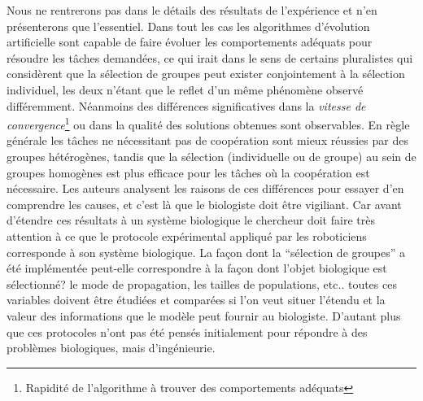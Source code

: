 \documentclass[a4paper,10pt]{article}
\begin{document}
Nous ne rentrerons pas dans le détails des résultats de l'expérience et n'en présenterons que l'essentiel. Dans tout les cas les algorithmes d'évolution artificielle sont capable de faire évoluer les comportements adéquats pour résoudre les t\^aches demandées, ce qui irait dans le sens de certains pluralistes qui considèrent que la sélection de groupes peut exister conjointement à la sélection individuel, les deux n'étant que le reflet d'un même phénomène observé différemment. 
Néanmoins des différences significatives dans la \emph{vitesse de convergence}\footnote{Rapidité de l'algorithme à trouver des comportements adéquats} ou dans la qualité des solutions obtenues sont observables. En règle générale les tâches ne nécessitant pas de coopération sont mieux réussies par des groupes hétérogènes, tandis que la sélection (individuelle ou de groupe) au sein de groupes homogènes est plus efficace pour les tâches où la coopération est nécessaire. Les auteurs analysent les raisons de ces différences pour essayer d'en comprendre les causes, et c'est là que le biologiste doit être vigiliant. Car avant d'étendre ces résultats à un système biologique le chercheur doit faire très attention à ce que le protocole expérimental appliqué par les roboticiens corresponde à son système biologique. La façon dont la ``sélection de groupes'' a été implémentée peut-elle correspondre à la façon dont l'objet biologique est sélectionné? le mode de propagation, les tailles de populations, etc.. toutes ces variables doivent être étudiées et comparées si l'on veut situer l'étendu et la valeur des informations que le modèle peut fournir au biologiste. D'autant plus que ces protocoles n'ont pas été pensés initialement pour répondre à des problèmes biologiques, mais d'ingénieurie.
\end{document}
